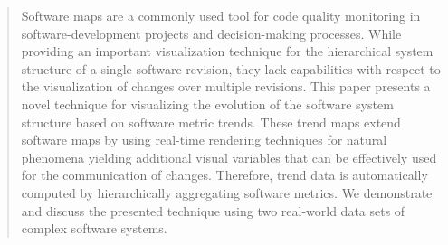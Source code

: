 
\begin{abstract}

Software maps are a commonly used tool for code quality monitoring in software-development projects and decision-making processes. 
While providing an important visualization technique for the hierarchical system structure of a single software revision, they lack capabilities with respect to the visualization of changes over multiple revisions. 
This paper presents a novel technique for visualizing the evolution of the software system structure based on software metric trends. 
These trend maps extend software maps by using real-time rendering techniques for natural phenomena yielding additional visual variables that can be effectively used for the communication of changes. 
Therefore, trend data is automatically computed by hierarchically aggregating software metrics. 
We demonstrate and discuss the presented technique using two real-world data sets of complex software systems.

\begin{classification} %
\end{classification}

\end{abstract}

